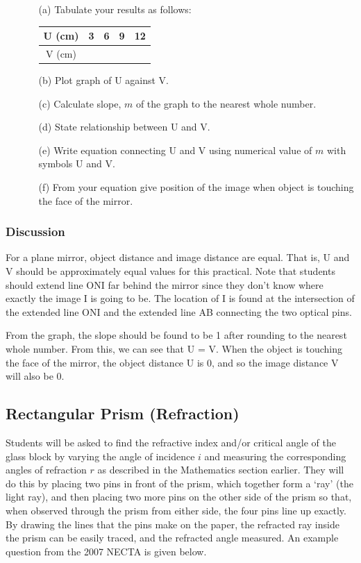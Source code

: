 \begin{enumerate}
\item[]
\begin{enumerate}
\item[(a)] Tabulate your results as follows:

\quad \begin{tabular}{|c|c|c|c|c|} \hline
U (cm) & 3 & 6 & 9 & 12 \\ \hline
V (cm) & & & & \\ \hline
\end{tabular}

\item[(b)] Plot graph of U against V.
\item[(c)] Calculate slope, $m$ of the graph to the nearest whole number.
\item[(d)] State relationship between U and V.
\item[(e)] Write equation connecting U and V using numerical value of $m$ with symbols U and V.
\item[(f)] From your equation give position of the image when object is touching the face of the mirror.
\end{enumerate}
\end{enumerate}

\subsubsection{Discussion}
For a plane mirror, object distance and image distance are equal. That is, U and V should be approximately equal values for this practical. Note that students should extend line ONI far behind the mirror since they don't know where exactly the image I is going to be. The location of I is found at the intersection of the extended line ONI and the extended line AB connecting the two optical pins.

From the graph, the slope should be found to be 1 after rounding to the nearest whole number. From this, we can see that U = V. When the object is touching the face of the mirror, the object distance U is 0, and so the image distance V will also be 0.

\subsection{Rectangular Prism (Refraction)}  

Students will be asked to find the refractive index and/or critical angle of the glass block by varying
the angle of incidence $i$ and measuring the corresponding angles of refraction $r$ as
described in the Mathematics section earlier. They will do this by placing two pins in
front of the prism, which together form a `ray' (the light ray), and then placing two more
pins on the other side of the prism so that, when observed through the prism from either
side, the four pins line up exactly. By drawing the lines that the pins make on the paper,
the refracted ray inside the prism can be easily traced, and the refracted angle measured.
An example question from the 2007 NECTA is given below.

